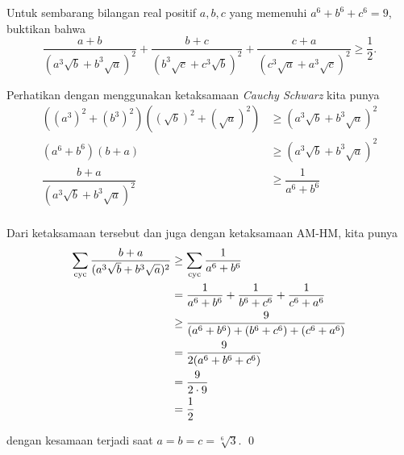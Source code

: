 \documentclass[12pt]{scrartcl}
\begin{document}
	
	\begin{soalbaru} Untuk sembarang bilangan real positif $a,b,c$ yang memenuhi $a^6+b^6+c^6=9$, buktikan bahwa $$\dfrac{a+b}{(a^3\sqrt{b}+b^3\sqrt{a})^2}+\dfrac{b+c}{(b^3\sqrt{c}+c^3\sqrt{b})^2}+\dfrac{c+a}{(c^3\sqrt{a}+a^3\sqrt{c})^2} \ge \dfrac{1}{2}.$$
	
	\begin{solusi}
	Perhatikan dengan menggunakan ketaksamaan \textit{Cauchy Schwarz} kita punya
	\begin{equation*}
	\begin{split}
	((a^3)^2+(b^3)^2)((\sqrt{b})^2+(\sqrt{a})^2) &\ge (a^3\sqrt{b}+b^3\sqrt{a})^2\\
	(a^6+b^6)(b+a) &\ge (a^3\sqrt{b}+b^3\sqrt{a})^2\\
	\dfrac{b+a}{(a^3\sqrt{b}+b^3\sqrt{a})^2} &\ge \dfrac{1}{a^6+b^6}\\
	\end{split}
	\end{equation*}
	
	Dari ketaksamaan tersebut dan juga dengan ketaksamaan AM-HM, kita punya
	\begin{equation*}
	\begin{split}
	\sum_{\mathrm{cyc}} \dfrac{b+a}{(a^3\sqrt{b}+b^3\sqrt{a})^2} &\ge \sum_{\mathrm{cyc}} \dfrac{1}{a^6+b^6}\\ &= \dfrac{1}{a^6+b^6}+\dfrac{1}{b^6+c^6}+\dfrac{1}{c^6+a^6}\\
	&\ge \dfrac{9}{(a^6+b^6)+(b^6+c^6)+(c^6+a^6)}\\
	&= \dfrac{9}{2(a^6+b^6+c^6)}\\
	&= \dfrac{9}{2\cdot 9}\\
	&= \dfrac{1}{2}
	\end{split}
	\end{equation*}
	
	dengan kesamaan terjadi saat $a=b=c=\sqrt[6]{3}$. \qed
	\end{solusi}
		\end{soalbaru}
	
\end{document}
